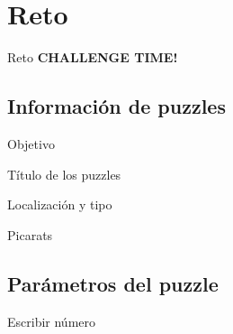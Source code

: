 \section{Reto}
\begin{frame}{Reto}
    \Huge\centering\textbf{CHALLENGE TIME!}
\end{frame}

\subsection{Información de puzzles}
\begin{frame}{Objetivo}
\end{frame}

\begin{frame}{Título de los puzzles}
\end{frame}

\begin{frame}{Localización y tipo}
\end{frame}

\begin{frame}{Picarats}
\end{frame}

\subsection{Parámetros del puzzle}
\begin{frame}{Escribir número}
\end{frame}
